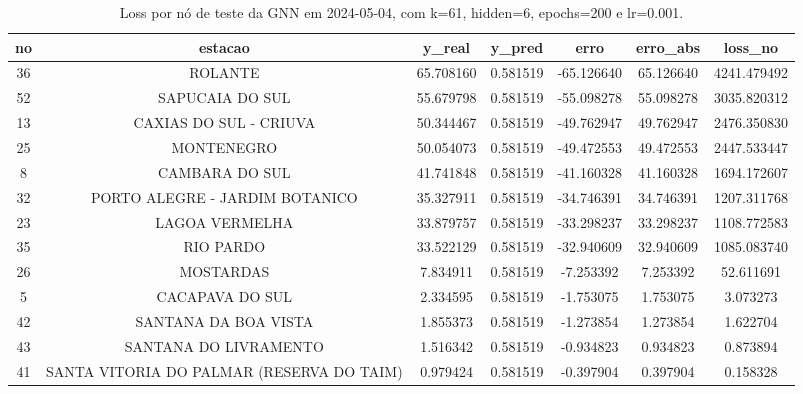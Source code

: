 \begin{table}[h]
\centering
\caption{Loss por nó de teste da GNN em 2024-05-04, com k=61, hidden=6, epochs=200 e lr=0.001.}
\label{tab:gnn_loss_nodes_k61_hidden6}
\begin{tabular}{ccccccc}
\toprule
no & estacao & y\_real & y\_pred & erro & erro\_abs & loss\_no \\
\midrule
36 & ROLANTE & 65.708160 & 0.581519 & -65.126640 & 65.126640 & 4241.479492 \\
52 & SAPUCAIA DO SUL & 55.679798 & 0.581519 & -55.098278 & 55.098278 & 3035.820312 \\
13 & CAXIAS DO SUL - CRIUVA & 50.344467 & 0.581519 & -49.762947 & 49.762947 & 2476.350830 \\
25 & MONTENEGRO & 50.054073 & 0.581519 & -49.472553 & 49.472553 & 2447.533447 \\
8 & CAMBARA DO SUL & 41.741848 & 0.581519 & -41.160328 & 41.160328 & 1694.172607 \\
32 & PORTO ALEGRE - JARDIM BOTANICO & 35.327911 & 0.581519 & -34.746391 & 34.746391 & 1207.311768 \\
23 & LAGOA VERMELHA & 33.879757 & 0.581519 & -33.298237 & 33.298237 & 1108.772583 \\
35 & RIO PARDO & 33.522129 & 0.581519 & -32.940609 & 32.940609 & 1085.083740 \\
26 & MOSTARDAS & 7.834911 & 0.581519 & -7.253392 & 7.253392 & 52.611691 \\
5 & CACAPAVA DO SUL & 2.334595 & 0.581519 & -1.753075 & 1.753075 & 3.073273 \\
42 & SANTANA DA BOA VISTA & 1.855373 & 0.581519 & -1.273854 & 1.273854 & 1.622704 \\
43 & SANTANA DO LIVRAMENTO & 1.516342 & 0.581519 & -0.934823 & 0.934823 & 0.873894 \\
41 & SANTA VITORIA DO PALMAR (RESERVA DO TAIM) & 0.979424 & 0.581519 & -0.397904 & 0.397904 & 0.158328 \\
\bottomrule
\end{tabular}
\end{table}
